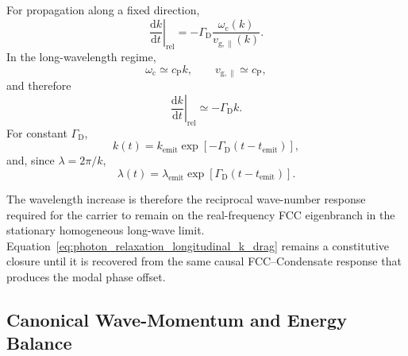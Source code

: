 For propagation along a fixed direction,
\begin{equation}
    \left.
        \frac{
            \mathrm dk
        }{
            \mathrm dt
        }
    \right|_{\mathrm{rel}}
    =
    -
    \Gamma_{\mathrm D}
    \frac{
        \omega_{\mathrm c}(k)
    }{
        v_{\mathrm{g},\parallel}(k)
    }.
    \label{eq:photon_relaxation_scalar_wavevector_drag}
\end{equation}
In the long-wavelength regime,
\begin{equation}
    \omega_{\mathrm c}
    \simeq
    c_{\mathrm P}k,
    \qquad
    v_{\mathrm{g},\parallel}
    \simeq
    c_{\mathrm P},
    \label{eq:photon_relaxation_long_wave_transport_limit}
\end{equation}
and therefore
\begin{equation}
    \left.
    \frac{
        \mathrm dk
    }{
        \mathrm dt
    }
    \right|_{\mathrm{rel}}
    \simeq
    -\Gamma_{\mathrm D}k.
    \label{eq:photon_relaxation_wave_number_decay}
\end{equation}
For constant \(\Gamma_{\mathrm D}\),
\begin{equation}
    k(t)
    =
    k_{\mathrm{emit}}
    \exp
    \left[
        -
        \Gamma_{\mathrm D}
        \left(
            t-t_{\mathrm{emit}}
        \right)
    \right],
    \label{eq:photon_relaxation_wave_number_solution}
\end{equation}
and, since \(\lambda=2\pi/k\),
\begin{equation}
    \lambda(t)
    =
    \lambda_{\mathrm{emit}}
    \exp
    \left[
        \Gamma_{\mathrm D}
        \left(
            t-t_{\mathrm{emit}}
        \right)
    \right].
    \label{eq:photon_relaxation_wavelength_solution}
\end{equation}

The wavelength increase is therefore the reciprocal wave-number response
required for the carrier to remain on the real-frequency FCC eigenbranch in
the stationary homogeneous long-wave limit.
Equation~\eqref{eq:photon_relaxation_longitudinal_k_drag} remains a
constitutive closure until it is recovered from the same causal
FCC--Condensate response that produces the modal phase offset.


\subsection{Canonical Wave-Momentum and Energy Balance}
\label{subsec:photon_relaxation_reservoir_balance}

